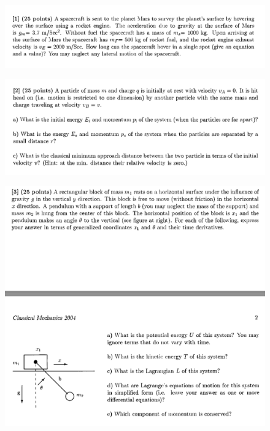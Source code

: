 \documentclass[10pt,a4paper]{article}
\begin{document}
\begin{figure}[H]
 \centering
 \includegraphics[width=16cm]{pdf/1-1T10.png}
\end{figure}
 \newpage
\begin{figure}[H]
 \centering
 \includegraphics[width=16cm]{pdf/1-1T11.png}
\end{figure}
 \newpage
\begin{figure}[H]
 \centering
 \includegraphics[width=16cm]{pdf/1-1T12.png}
\end{figure}
 \newpage
\end{document}
